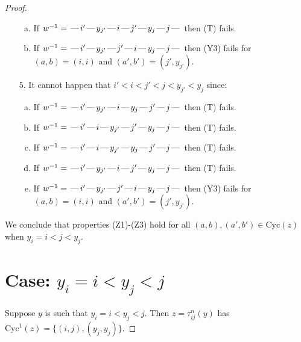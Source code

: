 \documentclass[10pt]{article}
\theoremstyle{definition}
\theoremstyle{definition}
\def\dash{\text{\hspace{0.5mm}---\hspace{0.5mm}}}
\def\Cyc{\mathrm{Cyc}}
\begin{document}
\begin{proof}
\begin{enumerate}
\begin{enumerate}[(a)]
\item If $w^{-1} = \dash i'\dash y_{j'}\dash i\dash j'\dash y_j\dash j\dash $ then (T) fails.
\item If $w^{-1} = \dash i'\dash y_{j'}\dash j'\dash i\dash y_j\dash j\dash $ then (Y3) fails for $(a,b)=(i,i)$ and $(a',b')=(j',y_{j'})$.
\end{enumerate}
\item[$5$.] It cannot happen that $i' < i < j' < j < y_{j'} < y_j$ since:
\begin{enumerate}[(a)]
\item If $w^{-1} = \dash i'\dash y_{j'}\dash i\dash y_j\dash j'\dash j\dash $ then (T) fails.
\item If $w^{-1} = \dash i'\dash i\dash y_{j'}\dash j'\dash y_j\dash j\dash $ then (T) fails.
\item If $w^{-1} = \dash i'\dash i\dash y_{j'}\dash y_j\dash j'\dash j\dash $ then (T) fails.
\item If $w^{-1} = \dash i'\dash y_{j'}\dash i\dash j'\dash y_j\dash j\dash $ then (T) fails.
\item If $w^{-1} = \dash i'\dash y_{j'}\dash j'\dash i\dash y_j\dash j\dash $ then (Y3) fails for $(a,b)=(i,i)$ and $(a',b')=(j',y_{j'})$.
\end{enumerate}
\end{enumerate}
We conclude that properties (Z1)-(Z3) hold for all 
$(a,b),(a',b') \in \Cyc(z)$ when $y_i = i < j < y_j$.
\section{Case: $y_i = i < y_j < j$}
Suppose $y$ is such that $y_i = i < y_j < j$.
Then $z = \tau^n_{ij}(y)$ has $\Cyc^1(z) = \{(i,j),(y_j,y_j)\}.$

\end{proof}
\end{document}
